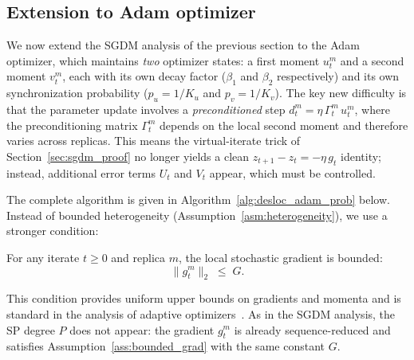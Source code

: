 \documentclass{article}
\begin{document}
\subsection{Extension to Adam optimizer}
\label{sec:adam_extension}

We now extend the SGDM analysis of the previous section to the Adam optimizer,
which maintains \emph{two} optimizer states: a first moment $u_t^m$ and a second
moment $v_t^m$, each with its own decay factor ($\beta_1$ and $\beta_2$
respectively) and its own synchronization probability ($p_u = 1/K_u$ and
$p_v = 1/K_v$). The key new difficulty is that the parameter update involves a
\emph{preconditioned} step $d_t^m = \eta\,\Gamma_t^m\,u_t^m$, where the
preconditioning matrix $\Gamma_t^m$ depends on the local second moment and
therefore varies across replicas. This means the virtual-iterate trick of
Section~\ref{sec:sgdm_proof} no longer yields a clean $z_{t+1} - z_t = -\eta\,g_t$
identity; instead, additional error terms $U_t$ and $V_t$ appear, which must be
controlled.

The complete algorithm is given in Algorithm~\ref{alg:desloc_adam_prob} below.
Instead of bounded heterogeneity (Assumption~\ref{asm:heterogeneity}), we use a
stronger condition:

\begin{assumption}
\label{ass:bounded_grad}
For any iterate $t \geq 0$ and replica $m$, the local stochastic gradient is
bounded:
\begin{equation}
\|g_t^m\|_2 \;\leq\; G.
\label{eq:bounded_grad}
\end{equation}
\end{assumption}

This condition provides uniform upper bounds on gradients and momenta and is
standard in the analysis of adaptive
optimizers~\citep{chen2019convergence,defossez2022simple,zhang2022adam}.
As in the SGDM analysis, the SP degree $P$ does not appear: the gradient
$g_t^m$ is already sequence-reduced and satisfies Assumption~\ref{ass:bounded_grad}
with the same constant $G$.
\end{document}

